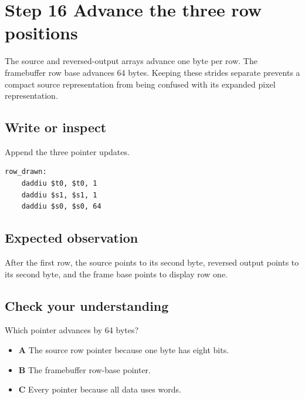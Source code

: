 \section{Step 16 Advance the three row
  positions}\label{003-eight-byte-sprite-s16-step-16-advance-the-three-row-positions}

The source and reversed-output arrays advance one byte per row. The
framebuffer row base advances 64 bytes. Keeping these strides separate
prevents a compact source representation from being confused with its
expanded pixel representation.

\subsection{Write or
  inspect}\label{003-eight-byte-sprite-s16-write-or-inspect}

Append the three pointer updates.

\begin{verbatim}
row_drawn:
    daddiu $t0, $t0, 1
    daddiu $s1, $s1, 1
    daddiu $s0, $s0, 64
\end{verbatim}

\subsection{Expected
  observation}\label{003-eight-byte-sprite-s16-expected-observation}

After the first row, the source points to its second byte, reversed
output points to its second byte, and the frame base points to display
row one.

\subsection{Check your
  understanding}\label{003-eight-byte-sprite-s16-check-your-understanding}

Which pointer advances by 64 bytes?

\begin{itemize}
  \tightlist
  \item
        \textbf{A} The source row pointer because one byte has eight bits.
  \item
        \textbf{B} The framebuffer row-base pointer.
  \item
        \textbf{C} Every pointer because all data uses words.
\end{itemize}

